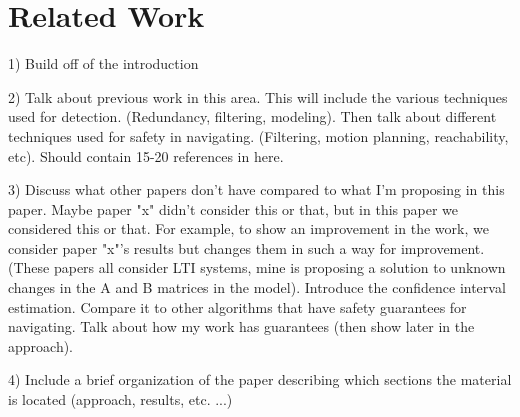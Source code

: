 
\section{Related Work} \label{sec:Related Work}

1) Build off of the introduction

2) Talk about previous work in this area. This will include the various techniques used for detection. (Redundancy, filtering, modeling). Then talk about different techniques used for safety in navigating. (Filtering, motion planning, reachability, etc). Should contain 15-20 references in here. 

3) Discuss what other papers don't have compared to what I'm proposing in this paper. Maybe paper "x" didn't consider this or that, but in this paper we considered this or that. For example, to show an improvement in the work, we consider paper "x"'s results but changes them in such a way for improvement. (These papers all consider LTI systems, mine is proposing a solution to unknown changes in the A and B matrices in the model). Introduce the confidence interval estimation. Compare it to other algorithms that have safety guarantees for navigating. Talk about how my work has guarantees (then show later in the approach).

4) Include a brief organization of the paper describing which sections the material is located (approach, results, etc. ...)


% 